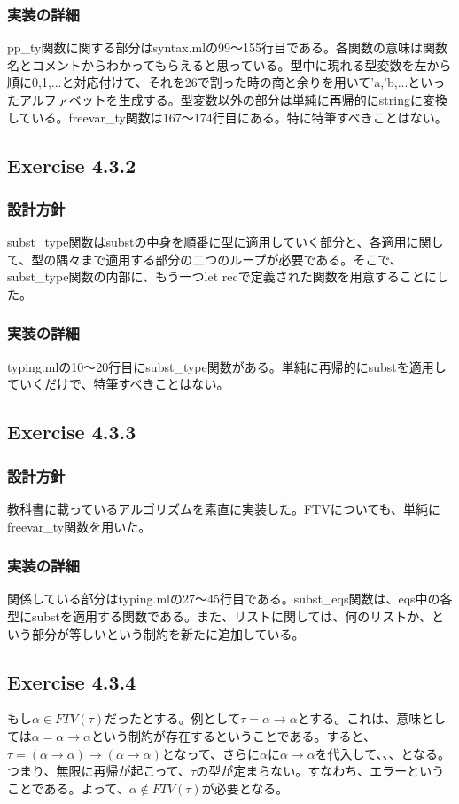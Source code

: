 \documentclass{jarticle}
\begin{document}
\subsubsection{実装の詳細}
pp\_ty関数に関する部分はsyntax.mlの99〜155行目である。各関数の意味は関数名とコメントからわかってもらえると思っている。型中に現れる型変数を左から順に0,1,...と対応付けて、それを26で割った時の商と余りを用いて'a,'b,...といったアルファベットを生成する。型変数以外の部分は単純に再帰的にstringに変換している。freevar\_ty関数は167〜174行目にある。特に特筆すべきことはない。

\subsection{Exercise 4.3.2}
\subsubsection{設計方針}
subst\_type関数はsubstの中身を順番に型に適用していく部分と、各適用に関して、型の隅々まで適用する部分の二つのループが必要である。そこで、subst\_type関数の内部に、もう一つlet recで定義された関数を用意することにした。
\subsubsection{実装の詳細}
typing.mlの10〜20行目にsubst\_type関数がある。単純に再帰的にsubstを適用していくだけで、特筆すべきことはない。

\subsection{Exercise 4.3.3}
\subsubsection{設計方針}
教科書に載っているアルゴリズムを素直に実装した。FTVについても、単純にfreevar\_ty関数を用いた。
\subsubsection{実装の詳細}
関係している部分はtyping.mlの27〜45行目である。subst\_eqs関数は、eqs中の各型にsubstを適用する関数である。また、リストに関しては、何のリストか、という部分が等しいという制約を新たに追加している。

\subsection{Exercise 4.3.4}
もし$\alpha \in FTV(\tau)$だったとする。例として$\tau = \alpha \rightarrow \alpha$とする。これは、意味としては$\alpha = \alpha \rightarrow \alpha$という制約が存在するということである。すると、$\tau = (\alpha \rightarrow \alpha) \rightarrow (\alpha \rightarrow \alpha)$となって、さらに$\alpha$に$\alpha \rightarrow \alpha$を代入して、、、となる。つまり、無限に再帰が起こって、$\tau$の型が定まらない。すなわち、エラーということである。よって、$\alpha \not\in FTV(\tau)$が必要となる。
\end{document}
